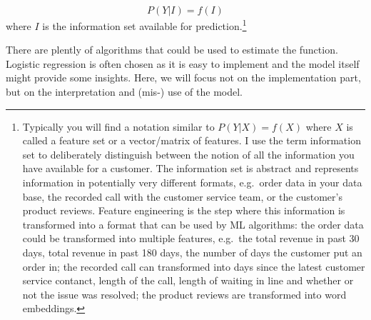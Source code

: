 \documentclass[
]{book}
\theoremstyle{definition}
\theoremstyle{definition}
\theoremstyle{definition}
\theoremstyle{remark}
\begin{document}
\begin{equation}
P(Y|I) = f(I) \label{eq:mktg1} \tag{1}
\end{equation}
where \(I\) is the information set available for prediction.\footnote{Typically you will find a notation similar to \(P(Y|X) = f(X)\) where \(X\) is called a feature set or a vector/matrix of features. I use the term information set to deliberately distinguish between the notion of all the information you have available for a customer. The information set is abstract and represents information in potentially very different formats, e.g.~order data in your data base, the recorded call with the customer service team, or the customer's product reviews. Feature engineering is the step where this information is transformed into a format that can be used by ML algorithms: the order data could be transformed into multiple features, e.g.~the total revenue in past 30 days, total revenue in past 180 days, the number of days the customer put an order in; the recorded call can transformed into days since the latest customer service contanct, length of the call, length of waiting in line and whether or not the issue was resolved; the product reviews are transformed into word embeddings.}

There are plently of algorithms that could be used to estimate the function. Logistic regression is often chosen as it is easy to implement and the model itself might provide some insights. Here, we will focus not on the implementation part, but on the interpretation and (mis-) use of the model.
\end{document}
